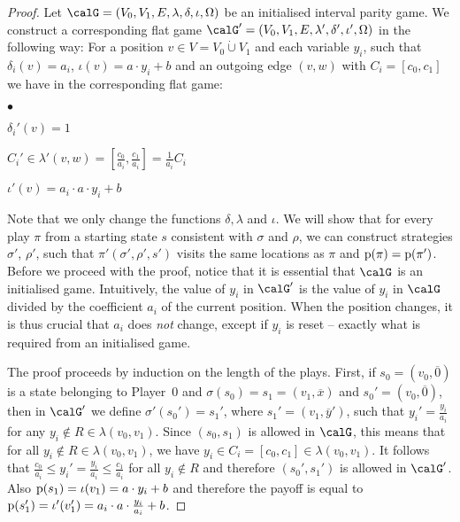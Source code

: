 \documentclass[fleqn,envcountsame]{LMCS}
\newcommand{\pzero}{Player~$0$\xspace}
\newcommand{\ol}[1]{\ensuremath{\overline{#1}}}
\newcommand{\labels}{\ensuremath{\lambda}}
\newcommand{\coeff}{\ensuremath{\delta}} \newcommand{\indexi}{\ensuremath{\iota}}
\newcommand{\cupdot}{\mathbin{\dot{\cup}}}
\begin{document}
\begin{proof}
Let $\calG = (V_0, V_1, E, \labels, \coeff,\indexi, \Omega)$
be an initialised interval parity game.
We construct a corresponding flat game 
$\calG'=(V_0, V_1, E, \labels', \coeff',\indexi', \Omega)$ in the following way:
For a position $v \in V = V_0 \cupdot V_1$ and each variable $y_i$, such that 
$\coeff_i(v)=a_i$, $\indexi(v)=a \cdot y_i + b$ and an outgoing edge $(v,w)$ with $C_i=[c_0,c_1]$
we have in the corresponding flat game:
\begin{iteMize}{$\bullet$}
\item $\coeff_i'(v)=1$
\item $C_i' \in \labels'(v,w) = [ \frac {c_0} {a_i} , \frac {c_1} {a_i}] = \frac 1 {a_i} C_i$
\item $\indexi'(v)=a_i \cdot a \cdot y_i + b$
\end{iteMize}
Note that we only change the functions $\coeff, \labels$ and $\indexi$.
We will show that for every play $\pi$ from a starting state $s$ consistent
with $\sigma$ and $\rho$, we can construct strategies $\sigma'$, $\rho'$,
such that $\pi'(\sigma', \rho',s')$ visits the same locations as $\pi$ and
$\mathrm{p}(\pi)=\mathrm{p}(\pi')$. Before we proceed with the proof, notice that it is
essential that $\calG$ is an initialised game. Intuitively, the value of $y_i$
in $\calG'$ is the value of $y_i$ in $\calG$ divided by the coefficient $a_i$
of the current position. When the position changes, it is thus crucial that
$a_i$ does \emph{not} change, except if $y_i$ is reset -- exactly what is
required from an initialised game.

The proof proceeds by induction on the length of the plays.
First, if $s_0=(v_0, \ol 0)$ is a state belonging to \pzero and
$\sigma(s_0)=s_1=(v_1, \ol x)$ and $s_0'=(v_0, \ol 0)$, then in $\calG'$
we define $\sigma'(s_0')=s_1'$, where $s_1'=(v_1,\ol y')$, such that
$y_i'=\frac {y_i} {a_i}$ for any $y_i \nin R \in \labels(v_0,v_1)$.
Since $(s_0,s_1)$ is allowed in $\calG$, this means that for all
$y_i \nin R \in \labels(v_0,v_1)$, we have
$y_i \in C_i=[c_0,c_1] \in \labels(v_0,v_1)$. It follows that
$\frac {c_0} {a_i} \leq y_i' = \frac {y_i} {a_i} \leq \frac {c_1} {a_i}$
for all $y_i \nin R$ and therefore $(s_0',s_1')$ is allowed in $\calG'$.
Also $\pay(s_1)= \indexi (v_1) = a \cdot y_i + b$ and therefore the payoff is
equal to $\pay(s_1')= \indexi'(v_1') = a_i \cdot a \cdot \frac {y_i} {a_i} + b$.


\end{proof}
\end{document}
